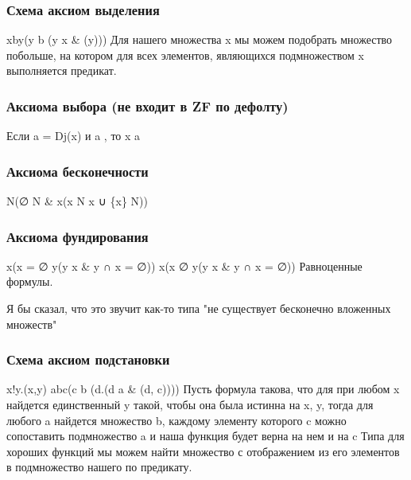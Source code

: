 \subsubsection{Схема аксиом выделения}
\label{sec-15-2-5}
\forall x\exists b\forall y(y \in b \leftrightarrow (y \in x \& \phi(y)))
Для нашего множества x мы можем подобрать множество побольше,
на котором для всех элементов, являющихся подмножеством x
выполняется предикат.
\subsubsection{Аксиома выбора (не входит в ZF по дефолту)}
\label{sec-15-2-6}
Если a = Dj(x) и a , то x \in a 
\subsubsection{Аксиома бесконечности}
\label{sec-15-2-7}
\exists N(∅ \in N \& \forall x(x \in N \to x ∪ \{x\} \in N))
\subsubsection{Аксиома фундирования}
\label{sec-15-2-8}
\forall x(x = ∅ \lor \exists y(y \in x \& y ∩ x = ∅))
\forall x(x \ne  ∅ \to \exists y(y \in x \& y ∩ x = ∅))
Равноценные формулы.

Я бы сказал, что это звучит как-то типа
"не существует бесконечно вложенных множеств"
\subsubsection{Схема аксиом подстановки}
\label{sec-15-2-9}
\forall x\exists !y.\phi(x,y) \to \forall a\exists b\forall c(c \in b \leftrightarrow (\exists d.(d \in a \& \phi(d, c))))
Пусть формула \phi такова, что для при любом x найдется единственный y
такой, чтобы она была истинна на x, y, тогда для любого a
найдется множество b, каждому элементу которого c можно сопоставить
подмножество a и наша функция будет верна на нем и на c
Типа для хороших функций мы можем найти множество с отображением из
его элементов в подмножество нашего по предикату.

